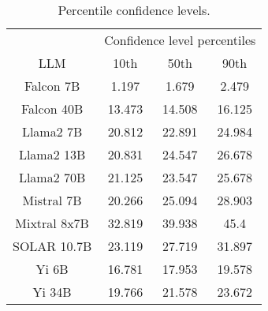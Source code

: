 \begin{table*}
\centering
\begin{tabular}{c|c|c|c}
& \multicolumn{3}{c}{Confidence level percentiles} \\ 
LLM & 10th & 50th & 90th\\ \hline
Falcon 7B & 1.197 & 1.679 & 2.479\\
Falcon 40B & 13.473 & 14.508 & 16.125\\
Llama2 7B & 20.812 & 22.891 & 24.984\\
Llama2 13B & 20.831 & 24.547 & 26.678\\
Llama2 70B & 21.125 & 23.547 & 25.678\\
Mistral 7B & 20.266 & 25.094 & 28.903\\
Mixtral 8x7B & 32.819 & 39.938 & 45.4\\
SOLAR 10.7B & 23.119 & 27.719 & 31.897\\
Yi 6B & 16.781 & 17.953 & 19.578\\
Yi 34B & 19.766 & 21.578 & 23.672\\
\hline
\end{tabular}
\caption{Percentile confidence levels.}
\label{tab:percentile_conf}
\end{table*}
